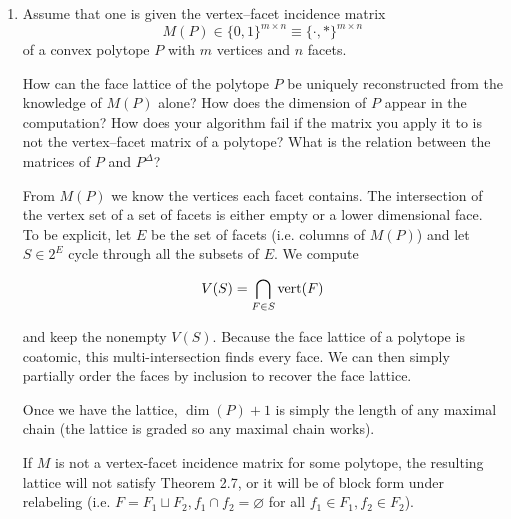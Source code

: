 \documentclass{article}
\begin{document}
\begin{enumerate}
\begin{proof}
We first prove the upper bound $f(d) < 2^{2^d}$. Indeed, for a $d$-dimensional $0/1$-polytope, it can have at most $2^d$ vertices (combinatorially equivalent to a subset of vertices in the $d$-cube). This amounts to $2^{(2^d)}$ choices for its vertex set. The strict inequality follows because not every choice of vertices generates a $d$-dimensional convex hull (for example, the trivial polytope, from picking exactly none of the points).

Following Sarangarajan and Ziegler's suggestion, we consider the suggested polytopes for the lower bound. There are exactly $2^{2^{d-1}}$ $d$-dimensional polytopes with every vertex having $x_d = 1$, and then the four further restrictions give the desired count of $2^{2^{d-1}-4}$ such polytopes. 

\end{proof}

\item Assume that one is given the vertex–facet incidence matrix 
\[ M(P) \in \{0,1\}^{m\times n} \equiv \{\cdot,\ast\}^{m\times n} \]
of a convex polytope $P$ with $m$ vertices and $n$ facets.

How can the face lattice of the polytope $P$ be uniquely reconstructed from the knowledge of $M(P)$ alone? How does the dimension of $P$ appear in the computation? How does your algorithm fail if the matrix you apply it to is not the vertex–facet matrix of a polytope? What is the relation between the matrices of $P$ and $P^\Delta$?

\begin{solution}
From $M(P)$ we know the vertices each facet contains. The intersection of the vertex set of a set of facets is either empty or a lower dimensional face. To be explicit, let $E$ be the set of facets (i.e. columns of $M(P)$) and let $S \in 2^E$ cycle through all the subsets of $E$. We compute

\[V(S) =  \bigcap_{F \in S}\textup{vert}(F)\]

and keep the nonempty $V(S)$. Because the face lattice of a polytope is coatomic, this multi-intersection finds every face. We can then simply partially order the faces by inclusion to recover the face lattice.

Once we have the lattice, $\dim(P)+1$ is simply the length of any maximal chain (the lattice is graded so any maximal chain works).

If $M$ is not a vertex-facet incidence matrix for some polytope, the resulting lattice will not satisfy Theorem 2.7, or it will be of block form under relabeling (i.e. $F = F_1 \sqcup F_2, f_1 \cap f_2 = \varnothing$ for all $f_1 \in F_1, f_2 \in F_2$).


\end{solution}
\end{enumerate}
\end{document}
